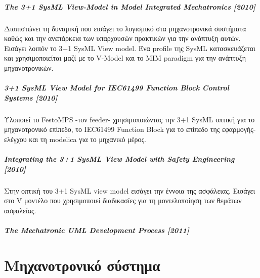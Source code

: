 \documentclass[a4paper,12pt,twoside]{report}
\begin{document}
{				\paragraph{The 3+1 SysML View-Model in Model Integrated Mechatronics [2010]}{Διαπιστώνει τη δυναμική που εισάγει το λογισμικό στα μηχανοτρονικά συστήματα καθώς και την ανεπάρκεια των υπαρχουσών πρακτικών για την ανάπτυξη αυτών. Εισάγει λοιπόν το 3+1 SysML View model. Ένα profile της SysML κατασκευάζεται και χρησιμοποιείται μαζί με το V-Model και το MIM paradigm για την ανάπτυξη μηχανοτρονικών. \cite{The3+1SysmlView-ModelInMIM:Thramboulidis2010}
				}
				
				\paragraph{3+1 SysML View Model for IEC61499 Function
Block Control Systems [2010]}{ Υλοποιεί το FestoMPS -τον feeder- χρησιμοποιώντας την 3+1 SysML οπτική για το μηχανοτρονικό επίπεδο, το IEC61499 Function Block για το επίπεδο της εφαρμογής-ελέγχου και τη modelica για το μηχανικό μέρος. \cite{3+1SysmlViewModelForIEC61499FBContolSystems:Thramboulidis2010}
				}
				
				\paragraph{Integrating the 3+1 SysML View Model
with Safety Engineering [2010]}{Στην οπτική του 3+1 SysML view model εισάγει την έννοια της ασφάλειας. Εισάγει στο V μοντέλο που χρησιμοποιεί διαδικασίες για τη μοντελοποίηση των θεμάτων ασφαλείας. \cite{IntegratingThe3+1SysnlViewModelWithSafetyEngineering:Thramboulidis2010}
				}
				
				\paragraph{The Mechatronic UML Development Process [2011] }{
				}
	\chapter{Μηχανοτρονικό σύστημα}
		\label{κεφ.:Μηχανοτρονικό σύστημα}

}
\end{document}
